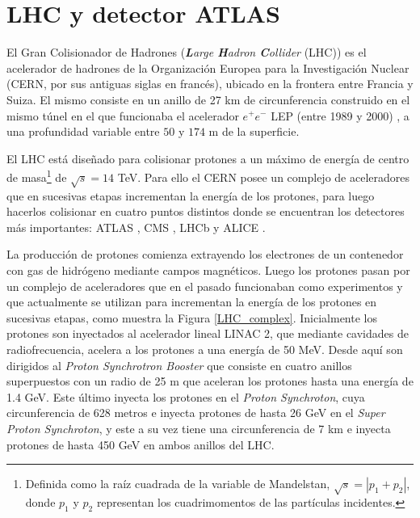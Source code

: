 \chapter{LHC y detector ATLAS}







El Gran Colisionador de Hadrones (\textit{\textbf{L}arge \textbf{H}adron \textbf{C}ollider} (LHC)) \cite{Evans:1129806} es el acelerador de hadrones de la Organización Europea para la Investigación Nuclear (CERN, por sus antiguas siglas en francés), ubicado en la frontera entre Francia y Suiza. El mismo consiste en un anillo de 27 km de circunferencia construido en el mismo túnel en el que funcionaba el acelerador $e^{+}e^{-}$ LEP (entre 1989 y 2000) \cite{LEPbook}, a una profundidad variable entre $50$ y $174$ m de la superficie.

El LHC está diseñado para colisionar protones a un máximo de energía de centro de masa\footnote{Definida como la raíz cuadrada de la variable de Mandelstan, $\sqrt{s}=|p_1+p_2|$, donde $p_1$ y $p_2$ representan los cuadrimomentos de las partículas incidentes.} de $\sqrt{s}=14$ TeV. Para ello el CERN posee un complejo de aceleradores que en sucesivas etapas incrementan la energía de los protones, para luego hacerlos colisionar en cuatro puntos distintos donde se encuentran los detectores más importantes: ATLAS \cite{PERF-2007-01}, CMS \cite{CMS}, LHCb \cite{LHCb} y ALICE \cite{ALICE}.

La producción de protones comienza extrayendo los electrones de un contenedor con gas de hidrógeno mediante campos magnéticos. Luego los protones pasan por un complejo de aceleradores que en el pasado funcionaban como experimentos y que actualmente se utilizan para incrementan la energía de los protones en sucesivas etapas, como muestra la Figura \ref{LHC_complex}. Inicialmente los protones son inyectados al acelerador lineal LINAC 2, que mediante cavidades de radiofrecuencia, acelera a los protones a una energía de 50 MeV. Desde aquí son dirigidos al \textit{Proton Synchrotron Booster} que consiste en cuatro anillos superpuestos con un radio de 25 m que aceleran los protones hasta una energía de 1.4 GeV. Este último inyecta los protones en el \textit{Proton Synchroton}, cuya circunferencia de 628 metros e inyecta protones de hasta 26 GeV en el \textit{Super Proton Synchroton}, y este a su vez tiene una circunferencia de 7 km e inyecta protones de hasta 450 GeV en ambos anillos del LHC. 

